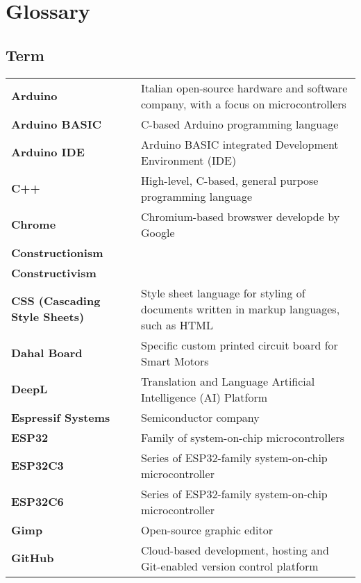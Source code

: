 \newpage%
\clearpage%
\chapter*{Glossary}%
%
%
%

\section*{\hspace{0pt}Term \hspace{111pt}{Definition}}%
{\renewcommand{\arraystretch}{1.5} \renewcommand{\tabcolsep}{0.cm}
\begin{longtable}{>{\raggedright \bfseries}p{} p{}}
Arduino             & Italian open-source hardware and software company, with a focus on microcontrollers \\
Arduino BASIC       & C-based Arduino programming language \\
Arduino IDE         & Arduino BASIC integrated Development Environment (IDE) \\
C++                 & High-level, C-based, general purpose programming language \\
Chrome              & Chromium-based browswer developde by Google \\
Constructionism     & \\
Constructivism      & \\
CSS (Cascading Style Sheets)    & Style sheet language for styling of documents written in markup languages, such as HTML \\
Dahal Board         & Specific custom printed circuit board for Smart Motors \\
DeepL               & Translation and Language Artificial Intelligence (AI) Platform \\
Espressif Systems   & Semiconductor company \\
ESP32               & Family of system-on-chip microcontrollers \\
ESP32C3             & Series of ESP32-family system-on-chip microcontroller \\
ESP32C6             & Series of ESP32-family system-on-chip microcontroller \\
Gimp                & Open-source graphic editor \\
GitHub              & Cloud-based development, hosting and Git-enabled version control platform \\

\end{longtable}}
